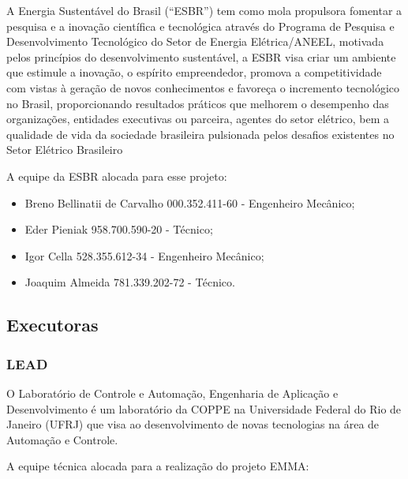 A Energia Sustentável do Brasil (“ESBR”) tem como mola propulsora fomentar a
pesquisa e a inovação científica e tecnológica através do Programa de Pesquisa e
Desenvolvimento Tecnológico do Setor de Energia Elétrica/ANEEL, motivada pelos
princípios do desenvolvimento sustentável, a ESBR visa criar um ambiente que
estimule a inovação, o espírito empreendedor, promova a competitividade com
vistas à geração de novos conhecimentos e favoreça o incremento tecnológico no
Brasil, proporcionando resultados práticos que melhorem o desempenho das
organizações, entidades executivas ou parceira, agentes do setor elétrico, bem a
qualidade de vida da sociedade brasileira pulsionada pelos desafios existentes
no Setor Elétrico Brasileiro

A equipe da ESBR alocada para esse projeto:

\begin{itemize}
  \item Breno Bellinatii de Carvalho 000.352.411-60 - Engenheiro Mecânico;
  \item Eder Pieniak 958.700.590-20 - Técnico;
  \item Igor Cella 528.355.612-34 - Engenheiro Mecânico;
  \item Joaquim Almeida 781.339.202-72 - Técnico.
\end{itemize}

\subsection{Executoras}

\subsubsection{ \textbf{LEAD} } 

O Laboratório de Controle e Automação, Engenharia
de Aplicação e Desenvolvimento é um laboratório da COPPE na Universidade
Federal do Rio de Janeiro (UFRJ) que visa ao desenvolvimento de novas
tecnologias na área de Automação e Controle.


A equipe técnica alocada para a realização do projeto EMMA:

